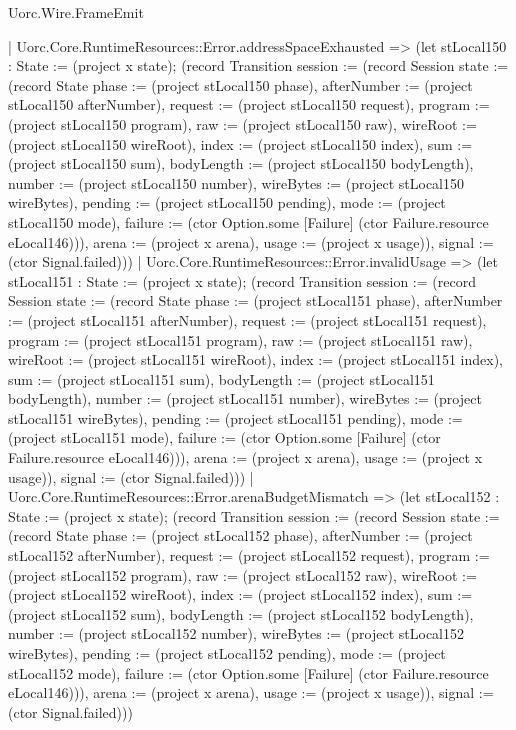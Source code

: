 \begin{lexlean}{Uorc.Wire.FrameEmit}
\begin{semanticmodule}
{      | Uorc.Core.RuntimeResources::Error.addressSpaceExhausted => (let stLocal150 : State := (project x state); (record Transition {session := (record Session {state := (record State {phase := (project stLocal150 phase), afterNumber := (project stLocal150 afterNumber), request := (project stLocal150 request), program := (project stLocal150 program), raw := (project stLocal150 raw), wireRoot := (project stLocal150 wireRoot), index := (project stLocal150 index), sum := (project stLocal150 sum), bodyLength := (project stLocal150 bodyLength), number := (project stLocal150 number), wireBytes := (project stLocal150 wireBytes), pending := (project stLocal150 pending), mode := (project stLocal150 mode), failure := (ctor Option.some [Failure] (ctor Failure.resource eLocal146))}), arena := (project x arena), usage := (project x usage)}), signal := (ctor Signal.failed)}))
      | Uorc.Core.RuntimeResources::Error.invalidUsage => (let stLocal151 : State := (project x state); (record Transition {session := (record Session {state := (record State {phase := (project stLocal151 phase), afterNumber := (project stLocal151 afterNumber), request := (project stLocal151 request), program := (project stLocal151 program), raw := (project stLocal151 raw), wireRoot := (project stLocal151 wireRoot), index := (project stLocal151 index), sum := (project stLocal151 sum), bodyLength := (project stLocal151 bodyLength), number := (project stLocal151 number), wireBytes := (project stLocal151 wireBytes), pending := (project stLocal151 pending), mode := (project stLocal151 mode), failure := (ctor Option.some [Failure] (ctor Failure.resource eLocal146))}), arena := (project x arena), usage := (project x usage)}), signal := (ctor Signal.failed)}))
      | Uorc.Core.RuntimeResources::Error.arenaBudgetMismatch => (let stLocal152 : State := (project x state); (record Transition {session := (record Session {state := (record State {phase := (project stLocal152 phase), afterNumber := (project stLocal152 afterNumber), request := (project stLocal152 request), program := (project stLocal152 program), raw := (project stLocal152 raw), wireRoot := (project stLocal152 wireRoot), index := (project stLocal152 index), sum := (project stLocal152 sum), bodyLength := (project stLocal152 bodyLength), number := (project stLocal152 number), wireBytes := (project stLocal152 wireBytes), pending := (project stLocal152 pending), mode := (project stLocal152 mode), failure := (ctor Option.some [Failure] (ctor Failure.resource eLocal146))}), arena := (project x arena), usage := (project x usage)}), signal := (ctor Signal.failed)}))
}
\end{semanticmodule}
\end{lexlean}
